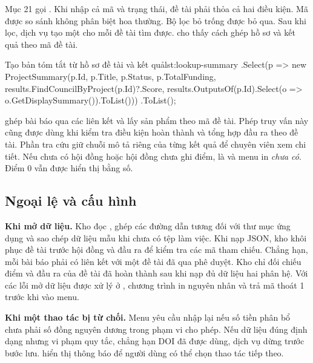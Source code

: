 Mục 21 gọi . Khi nhập cả mã và trạng thái, đề tài phải thỏa cả hai điều kiện. Mã được so sánh không phân biệt hoa thường. Bộ lọc bỏ trống được bỏ qua. Sau khi lọc, dịch vụ tạo một  cho mỗi đề tài tìm được.  cho thấy cách ghép hồ sơ và kết quả theo mã đề tài.

\begin{ReportCode}[firstnumber=21,gobble=8]{Tạo bản tóm tắt từ hồ sơ đề tài và kết quả}{lst:lookup-summary}
            .Select(p => new ProjectSummary(p.Id, p.Title, p.Status, p.TotalFunding,
                results.FindCouncilByProject(p.Id)?.Score,
                results.OutputsOf(p.Id).Select(o => o.GetDisplaySummary()).ToList()))
            .ToList();
\end{ReportCode}

 ghép bài báo qua các liên kết và lấy sản phẩm theo mã đề tài. Phép truy vấn này cũng được dùng khi kiểm tra điều kiện hoàn thành và tổng hợp đầu ra theo đề tài. Phần tra cứu giữ chuỗi mô tả riêng của từng kết quả để chuyên viên xem chi tiết. Nếu chưa có hội đồng hoặc hội đồng chưa ghi điểm,  là  và menu in \emph{chưa có}. Điểm 0 vẫn được hiển thị bằng số.

\subsection{Ngoại lệ và cấu hình}\label{sec:errors-config}

\textbf{Khi mở dữ liệu.} Kho đọc , ghép các đường dẫn tương đối với thư mục ứng dụng và sao chép dữ liệu mẫu khi chưa có tệp làm việc. Khi nạp JSON, kho khôi phục đề tài trước hội đồng và đầu ra để kiểm tra các mã tham chiếu. Chẳng hạn, mỗi bài báo phải có liên kết với một đề tài đã qua phê duyệt. Kho chỉ đối chiếu điểm và đầu ra của đề tài đã hoàn thành sau khi nạp đủ dữ liệu hai phân hệ. Với các lỗi mở dữ liệu được xử lý ở , chương trình in nguyên nhân và trả mã thoát 1 trước khi vào menu.

\textbf{Khi một thao tác bị từ chối.} Menu yêu cầu nhập lại nếu số tiền phân bổ chưa phải số đồng nguyên dương trong phạm vi cho phép. Nếu dữ liệu đúng định dạng nhưng vi phạm quy tắc, chẳng hạn DOI đã được dùng, dịch vụ dừng trước bước lưu.  hiển thị thông báo để người dùng có thể chọn thao tác tiếp theo.

